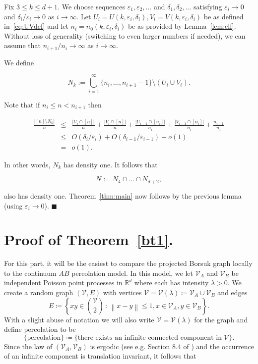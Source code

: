 \documentclass[11pt]{article}%
\newenvironment{proofof}[1]{\vspace{1ex}\noindent{\bf Proof of #1.}}{\hspace*{\fill}$\blacksquare$\vspace{1ex}}
\newcommand{\norm}[1]{\ensuremath{\left\|#1\right\|}}
\newcommand{\eps}{\varepsilon}
\newcommand{\RR}{\mathbb{R}}
\begin{document}
\begin{proofof}{Theorem~\ref{thm:main}}
Fix $3\leq k \leq d+1$.
We choose sequences $\eps_1,\eps_2,\dots$ and $\delta_1,\delta_2, \dots$ 
satisfying $\eps_i \to 0$ and $\delta_i/\eps_i \to 0$ as $i \to \infty$.
Let $U_i = U(k,\eps_i,\delta_i), V_i = V(k,\eps_i,\delta_i)$ be as defined in~\eqref{eq:UVdef}
and let $n_i = n_0(k,\eps_i,\delta_i)$ be as provided by Lemma~\ref{lem:elf}.
Without loss of generality (switching to even larger numbers if needed), we can assume that 
$n_{i+1}/n_i \to \infty$ as $i\to\infty$.

We define 

$$ N_k := \bigcup_{i=1}^\infty \{n_i, \dots, n_{i+1}-1\} \setminus (U_i\cup V_i). $$

Note that if $n_i \leq n < n_{i+1}$ then 

$$ \begin{array}{rcl} \frac{|[n]\setminus N_k|}{n} & \leq & \frac{|U_i \cap [n]|}{n} + \frac{|V_i \cap [n]|}{n}
+ \frac{|U_{i-1} \cap [n_i]|}{n_i} + \frac{|V_{i-1} \cap [n_i]|}{n_i}
+ \frac{n_{i-1}}{n_i} \\
& \leq & O(\delta_i/\eps_i) + O(\delta_{i-1}/\eps_{i-1}) + o(1) \\ & = & o(1). \end{array} $$

\noindent
In other words, $N_k$ has density one. It follows that

$$ N := N_4\cap\dots\cap N_{d+2}, $$

\noindent
also has density one.
Theorem~\ref{thm:main} now follows by the previous lemma (using $\eps_i \to 0$).
\end{proofof}


\section{Proof of Theorem~\ref{bt1}.\label{sec:bt1}}


For this part, it will be the easiest to compare the projected Borsuk graph locally to the continuum $AB$ percolation model.
In this model, we let $ \mathcal{V}_A $ and  $ \mathcal{V}_B $ be independent Poisson point processes in $ \RR^d $ where each has intensity $ \lambda>0 $. We create a random graph $(\mathcal{V},E) $ with vertices $ \mathcal{V}=\mathcal{V}(\lambda)\coloneqq\mathcal{V}_A\cup\mathcal{V}_B $ 
and edges
	\begin{equation*}
		E\coloneqq\left\{ xy \in {\mathcal{V}\choose 2} \,:\, \norm{x-y}\leq 1, x\in 
		\mathcal{V}_A, y\in\mathcal{V}_B\right\}.
	\end{equation*} 
	With a slight abuse of notation we will also write $\mathcal{V}=\mathcal{V}(\lambda)$ for the graph and  define percolation to be
	\begin{equation*}
	\{\text{percolation}\}\coloneqq\{\text{there exists an infinite connected component in }\mathcal{V}\}.
	\end{equation*}
	Since the law of $ (\mathcal{V}_A,\mathcal{V}_B) $ is ergodic (see e.g. Section 8.4 of \cite{Last_Penrose_2017}) 
	and the occurrence of an infinite component is translation invariant, 
	it follows that 
	
\end{document}
